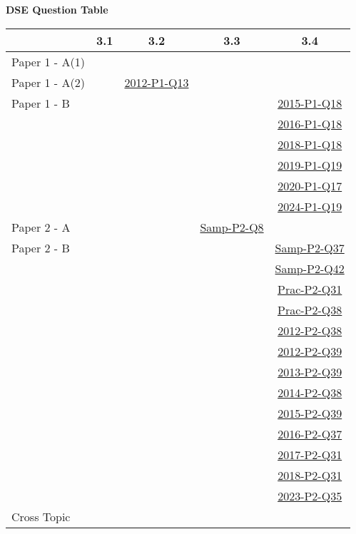 \documentclass[12pt, a4paper]{article}
\begin{document}
\begin{absolutelynopagebreak}
\begin{center}
\textbf{DSE Question Table}
\end{center}
\begin{center}
\begin{tabular}{|l|c|c|c|c|}
\hline
        & 3.1 & 3.2 & 3.3 & 3.4 \\\hline
\hline
Paper 1 - A(1)&  &  &  &  \\
\hline
Paper 1 - A(2)&  & \hyperref[DSE2012-CoreP1-Q13]{2012-P1-Q13} &  &  \\
\hline
Paper 1 - B&  &  &  & \hyperref[DSE2015-CoreP1-Q18]{2015-P1-Q18} \\
&  &  &  & \hyperref[DSE2016-CoreP1-Q18]{2016-P1-Q18} \\
&  &  &  & \hyperref[DSE2018-CoreP1-Q18]{2018-P1-Q18} \\
&  &  &  & \hyperref[DSE2019-CoreP1-Q19]{2019-P1-Q19} \\
&  &  &  & \hyperref[DSE2020-CoreP1-Q17]{2020-P1-Q17} \\
&  &  &  & \hyperref[DSE2024-CoreP1-Q19]{2024-P1-Q19} \\
\hline
\hline
Paper 2 - A&  &  & \hyperref[DSE2012S-CoreP2-Q08]{Samp-P2-Q8} &  \\
\hline
Paper 2 - B&  &  &  & \hyperref[DSE2012S-CoreP2-Q37]{Samp-P2-Q37} \\
&  &  &  & \hyperref[DSE2012S-CoreP2-Q42]{Samp-P2-Q42} \\
&  &  &  & \hyperref[DSE2012P-CoreP2-Q31]{Prac-P2-Q31} \\
&  &  &  & \hyperref[DSE2012P-CoreP2-Q38]{Prac-P2-Q38} \\
&  &  &  & \hyperref[DSE2012-CoreP2-Q38]{2012-P2-Q38} \\
&  &  &  & \hyperref[DSE2012-CoreP2-Q39]{2012-P2-Q39} \\
&  &  &  & \hyperref[DSE2013-CoreP2-Q39]{2013-P2-Q39} \\
&  &  &  & \hyperref[DSE2014-CoreP2-Q38]{2014-P2-Q38} \\
&  &  &  & \hyperref[DSE2015-CoreP2-Q39]{2015-P2-Q39} \\
&  &  &  & \hyperref[DSE2016-CoreP2-Q37]{2016-P2-Q37} \\
&  &  &  & \hyperref[DSE2017-CoreP2-Q31]{2017-P2-Q31} \\
&  &  &  & \hyperref[DSE2018-CoreP2-Q31]{2018-P2-Q31} \\
&  &  &  & \hyperref[DSE2023-CoreP2-Q35]{2023-P2-Q35} \\
\hline
\hline
Cross Topic&  &  &  &  \\
\hline
\end{tabular}
\end{center}
\end{absolutelynopagebreak}
\end{document}
